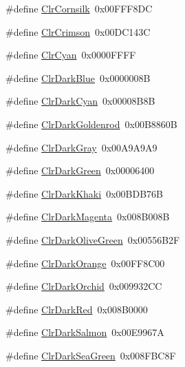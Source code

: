 \begin{DoxyCompactItemize}
\item 
\#define \hyperlink{group__primitives__api_gaf4f58871550e1acffbbd106c095c6bec}{Clr\+Cornsilk}~0x00\+F\+F\+F8\+D\+C
\item 
\#define \hyperlink{group__primitives__api_ga7d19368ba878a36d5d88054ca3ae369a}{Clr\+Crimson}~0x00\+D\+C143\+C
\item 
\#define \hyperlink{group__primitives__api_ga8c672c4d7fcbcd2893d22b6cec9df4e3}{Clr\+Cyan}~0x0000\+F\+F\+F\+F
\item 
\#define \hyperlink{group__primitives__api_ga2195de950ddcbf8de75d9a03bc3e1e22}{Clr\+Dark\+Blue}~0x0000008\+B
\item 
\#define \hyperlink{group__primitives__api_ga6b18527b3da6dacabd765fc561a2ab2c}{Clr\+Dark\+Cyan}~0x00008\+B8\+B
\item 
\#define \hyperlink{group__primitives__api_ga02febfe6c114436344dbf52ac8eb816f}{Clr\+Dark\+Goldenrod}~0x00\+B8860\+B
\item 
\#define \hyperlink{group__primitives__api_ga2305555bea0b9c60d35f0e65c3efa565}{Clr\+Dark\+Gray}~0x00\+A9\+A9\+A9
\item 
\#define \hyperlink{group__primitives__api_gadced3b4f8092357e078fa602cb401e4a}{Clr\+Dark\+Green}~0x00006400
\item 
\#define \hyperlink{group__primitives__api_gaa785ed6b73de40cc2125e03abe300894}{Clr\+Dark\+Khaki}~0x00\+B\+D\+B76\+B
\item 
\#define \hyperlink{group__primitives__api_ga7dff882632f34bb71f13910f846d06a7}{Clr\+Dark\+Magenta}~0x008\+B008\+B
\item 
\#define \hyperlink{group__primitives__api_gadd89442b93301ae704fbe1e4e7f270cd}{Clr\+Dark\+Olive\+Green}~0x00556\+B2\+F
\item 
\#define \hyperlink{group__primitives__api_ga22ce11a42204aecfaa82c5ed77659e35}{Clr\+Dark\+Orange}~0x00\+F\+F8\+C00
\item 
\#define \hyperlink{group__primitives__api_gab18050e4c19995bebeb0934b678d2eea}{Clr\+Dark\+Orchid}~0x009932\+C\+C
\item 
\#define \hyperlink{group__primitives__api_ga0d2bdb41f75bbcf1b6856b0a91f40c69}{Clr\+Dark\+Red}~0x008\+B0000
\item 
\#define \hyperlink{group__primitives__api_gabb32662d72987157abdc545b9e6cc17d}{Clr\+Dark\+Salmon}~0x00\+E9967\+A
\item 
\#define \hyperlink{group__primitives__api_ga7df87d9fc8e9426d16e69660d07926a4}{Clr\+Dark\+Sea\+Green}~0x008\+F\+B\+C8\+F
\item 

\end{DoxyCompactItemize}

